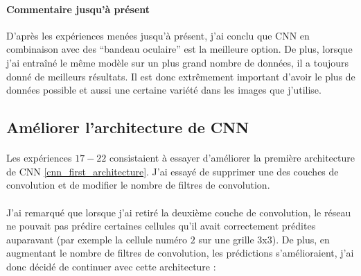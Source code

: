 \paragraph{Commentaire jusqu'à présent}
D'après les expériences menées jusqu'à présent, j'ai conclu que CNN en combinaison avec des ``bandeau oculaire'' est la meilleure option.
De plus, lorsque j'ai entraîné le même modèle sur un plus grand nombre de données, il a toujours donné de meilleurs résultats.
Il est donc extrêmement important d'avoir le plus de données possible et aussi une certaine variété dans les images que j'utilise.

\subsection{Améliorer l'architecture de CNN}
\paragraph{}
Les expériences $17-22$ consistaient à essayer d'améliorer la première architecture de CNN \ref{cnn_first_architecture}.
J'ai essayé de supprimer une des couches de convolution et de modifier le nombre de filtres de convolution.


\paragraph{}
J'ai remarqué que lorsque j'ai retiré la deuxième couche de convolution, le réseau ne pouvait pas prédire certaines cellules qu'il avait correctement prédites auparavant (par exemple la cellule numéro $2$ sur une grille 3x3).
De plus, en augmentant le nombre de filtres de convolution, les prédictions s'amélioraient, j'ai donc décidé de continuer avec cette architecture :


